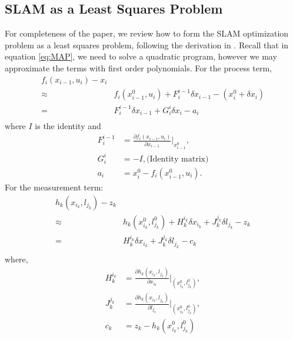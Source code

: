 \appendix
\subsection{SLAM as a Least Squares Problem}
\label{appendix:leastsquare}
For completeness of the paper, we review how to form the SLAM optimization problem as a least squares problem, following the derivation in \cite{isam}. Recall that in equation \ref{eq:MAP}, we need to solve a quadratic program, however we may approximate the terms with first order polynomials. For the process term,
\begin{equation}
\begin{aligned}
f_i(x_{i-1}, u_i) - x_i\\
\approx & {f_i(x_{i-1}^0, u_i)} + F_i^{i-1}\delta x_{i-1} - (x_i^0 + \delta x_i)\\
=& F_i^{i-1}\delta x_{i-1} + G_i^i\delta x_i - a_i \\
\end{aligned}
\label{eq:linearProcessTerm}
\end{equation}
where $I$ is the identity and %
\begin{equation*}
\begin{aligned}
F_i^{i-1} &= \frac{\partial f_i(x_{i-1}, u_i)}{\partial x_{i-1}}|_{x_{i-1}^0}, \label{F} \\%
 G_i^i &= -I, \text{(Identity matrix)}\\%
a_i &= x_i^0 - f_i(x_{i-1}^0, u_i).
\end{aligned}
\end{equation*}
For the measurement term:
\begin{equation}
\begin{aligned}
h_k(x_{i_k}, l_{j_k}) - z_k\\
\approx & {h_k(x_{i_k}^0, l_{j_k}^0) + H_k^{i_k}\delta x_{i_k} + J_k^{j_k}\delta l_{j_k}} - z_k\\
= & {H_k^{i_k}\delta x_{i_k} + J_k^{j_k}\delta l_{j_k}} - c_k\\
\end{aligned}
\label{eq:linearMeasurementTerm}
\end{equation}
where, %
\begin{equation*}
\begin{aligned}
H_k^{i_k} &= \frac{\partial h_k(x_{i_k}, l_{j_k})}{\partial x_{i_k}}|_{(x_{i_k}^0, l_{j_k}^0)}, \\ 
J_k^{j_k} &= \frac{\partial h_k(x_{i_k}, l_{j_k})}{\partial l_{j_k}}|_{(x_{i_k}^0, l_{j_k}^0)} , \\
 c_k &= z_k - h_k(x_{i_k}^0, l_{j_k}^0)
\end{aligned}
\end{equation*}
